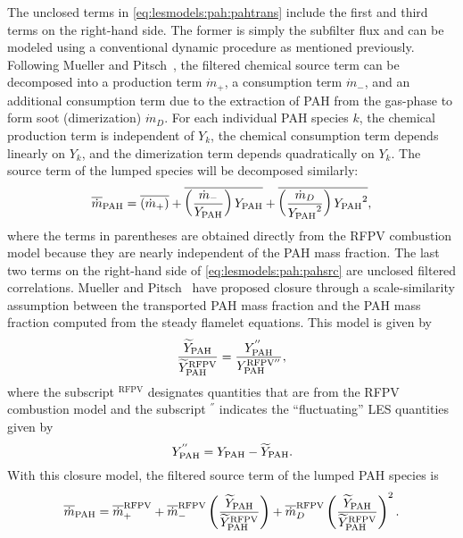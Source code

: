 The unclosed terms in \cref{eq:lesmodels:pah:pahtrans} include the first and third terms on the right-hand side. The former is simply the subfilter flux and can be modeled using a conventional dynamic procedure as mentioned previously. Following Mueller and Pitsch~\cite{mueller2012}, the filtered chemical source term can be decomposed into a production term $\dot{m}_{+}$, a consumption term $\dot{m}_{-}$, and an additional consumption term due to the extraction of PAH from the gas-phase to form soot (dimerization) $\dot{m}_{D}$. For each individual PAH species $k$, the chemical production term is independent of $Y_k$, the chemical consumption term depends linearly on $Y_k$, and the dimerization term depends quadratically on $Y_k$. The source term of the lumped species will be decomposed similarly:
\begin{equation}\label{eq:lesmodels:pah:pahsrc}
  \fst[m]{\text{PAH}} = \mean{(\dot{m}_{+})} + \mean{\left( \frac{\dot{m}_{-}}{Y_{\text{PAH}}} \right) Y_{\text{PAH}}} + \mean{\left( \frac{\dot{m}_{D}}{{Y_{\text{PAH}}}^2} \right) {Y_{\text{PAH}}}^2},
\end{equation}
where the terms in parentheses are obtained directly from the RFPV combustion model because they are nearly independent of the PAH mass fraction. The last two terms on the right-hand side of \cref{eq:lesmodels:pah:pahsrc} are unclosed filtered correlations. Mueller and Pitsch~\cite{mueller2012} have proposed closure through a scale-similarity assumption between the transported PAH mass fraction and the PAH mass fraction computed from the steady flamelet equations. This model is given by
\begin{equation}\label{eq:lesmodels:pah:similarity}
  \frac{\tf{Y}_{\text{PAH}}}{\tf{Y}_{\text{PAH}}^{\text{RFPV}}} = \frac{Y_{\text{PAH}}^{''}}{Y_{\text{PAH}}^{\text{RFPV}''}},
\end{equation}
where the subscript $^{\text{RFPV}}$ designates quantities that are from the RFPV combustion model and the subscript $^{''}$ indicates the ``fluctuating'' LES quantities given by
\begin{equation}\label{eq:lesmodels:pah:residual}
  Y_{\text{PAH}}^{''} = Y_{\text{PAH}} - \tf{Y}_{\text{PAH}}.
\end{equation}
With this closure model, the filtered source term of the lumped PAH species is
\begin{equation}\label{eq:lesmodels:pah:pahsrcmodeled}
  \fst[m]{\text{PAH}} = \mean{\dot{m}}_{+}^{\text{RFPV}} + \mean{\dot{m}}_{-}^{\text{RFPV}}\left( \frac{\tf{Y}_{\text{PAH}}}{\tf{Y}_{\text{PAH}}^{\text{RFPV}}} \right) + \mean{\dot{m}}_{D}^{\text{RFPV}}\left( \frac{\tf{Y}_{\text{PAH}}}{\tf{Y}_{\text{PAH}}^{\text{RFPV}}} \right)^2.
\end{equation}
